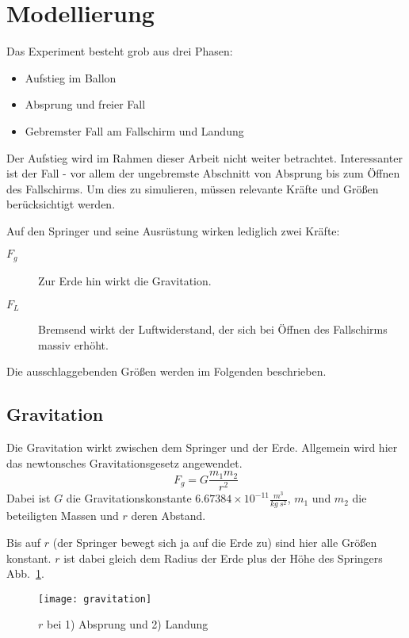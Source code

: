 \section{Modellierung}

Das Experiment besteht grob aus drei Phasen:
\begin{itemize}
  \item Aufstieg im Ballon
  \item Absprung und freier Fall
  \item Gebremster Fall am Fallschirm und Landung
\end{itemize}
Der Aufstieg wird im Rahmen dieser Arbeit nicht weiter betrachtet.
Interessanter ist der Fall - vor allem der ungebremste Abschnitt von Absprung bis zum Öffnen des Fallschirms.
Um dies zu simulieren, müssen relevante Kräfte und Größen berücksichtigt werden. %

Auf den Springer und seine Ausrüstung wirken lediglich zwei Kräfte:
\begin{description}
  \item[$F_g$] Zur Erde hin wirkt die Gravitation.
  \item[$F_L$] Bremsend wirkt der Luftwiderstand, der sich bei Öffnen des Fallschirms massiv erhöht.
\end{description}

Die ausschlaggebenden Größen werden im Folgenden beschrieben.


\subsection{Gravitation}
Die Gravitation wirkt zwischen dem Springer und der Erde.
Allgemein wird hier das newtonsches Gravitationsgesetz angewendet.
\begin{equation}
F_g=G \frac{m_1 m_2}{r^2}
\end{equation}
Dabei ist $G$ die Gravitationskonstante $6.67384\times 10^{-11} \frac{m^3}{kg\ s^2}$, $m_1$ und $m_2$ die beteiligten Massen und $r$ deren Abstand.

Bis auf $r$ (der Springer bewegt sich ja auf die Erde zu) sind hier alle Größen konstant.
$r$ ist dabei gleich dem Radius der Erde plus der Höhe des Springers \vgl Abb.~\ref{fig:gravitation}.
\begin{figure}[h]
  \centering
  \texttt{[image: gravitation]}
  \caption{$r$ bei 1) Absprung und 2) Landung}
  \label{fig:gravitation}
\end{figure}


